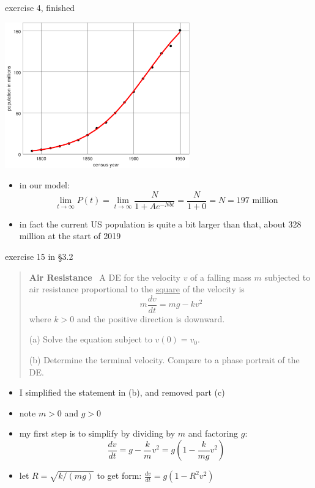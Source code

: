 \documentclass{beamer}
\begin{document}
\begin{frame}{exercise 4, finished}

\begin{center}
\includegraphics[width=0.6\textwidth]{figs/fitcensus}
\end{center}

\vspace{-2mm}
\begin{itemize}
\item in our model:
    $$\lim_{t\to \infty} P(t) = \lim_{t\to \infty} \frac{N}{1 + A e^{-Nbt}} = \frac{N}{1+0} = N = 197 \text{ million}$$
\item in fact the current US population is quite a bit larger than that, about 328 million at the start of 2019
\end{itemize}
\end{frame}


\begin{frame}{exercise 15 in \S3.2}

\begin{quotation}
\noindent \textbf{Air Resistance} \, A DE for the velocity $v$ of a falling mass $m$ subjected to air resistance proportional to the \underline{square} of the velocity is
    $$m \frac{dv}{dt} = m g - k v^2$$
where $k>0$ and the positive direction is downward.

(a) Solve the equation subject to $v(0)=v_0$.

(b) Determine the terminal velocity.  Compare to a phase portrait of the DE.
\end{quotation}

\begin{itemize}
\item I simplified the statement in (b), and removed part (c)
\item note $m>0$ and $g>0$
\item my first step is to simplify by dividing by $m$ and factoring $g$:
    $$\frac{dv}{dt} = g - \frac{k}{m} v^2 = g \left(1 - \frac{k}{mg} v^2\right)$$
\item let $R=\sqrt{k/(mg)}$ to get form: $\frac{dv}{dt} = g \left(1 - R^2 v^2\right)$
\end{itemize}
\end{frame}
\end{document}
